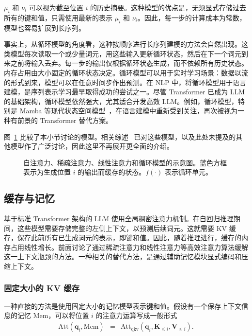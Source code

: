 \noindent $\mu_i$ 和 $\nu_i$ 可以视为截至位置 $i$ 的历史摘要。这种模型的优点是，无须显式存储过去所有的键和值，只需使用最新的表示 $\mu_i$ 和 $\nu_i$。因此，每一步的计算成本为常数，模型也容易扩展到长序列。

事实上，从循环模型的角度看，这种按顺序进行长序列建模的方法会自然出现。这类模型每次读取一个或少量词元，用这些输入更新循环状态，然后在下一个词元到来之前将输入丢弃。每一步的输出仅根据循环状态生成，而不依赖所有历史状态。内存占用由大小固定的循环状态决定。循环模型可以用于实时学习场景：数据以流的形式到来，模型可以在任意时间步作出预测。在 NLP 中，将循环模型用于语言建模，是序列表示学习最早取得成功的尝试之一。尽管 Transformer 已成为 LLM 的基础架构，循环模型依然强大，尤其适合开发高效 LLM。例如，循环模型，特别是 Mamba 等现代状态空间模型~\cite{gu-and-dao:2023mamba}，在语言建模中重新受到关注，再次被视为一种有前景的 Transformer 替代方案。

图~\ref{fig:comparison-of-efficient-llm-architectures} 比较了本小节讨论的模型。相关综述~\cite{Tay-etal:2020efficient,xiao-and-zhu:2023introduction} 已对这些模型，以及此处未提及的其他模型作了广泛讨论，因此这里不再展开更全面的介绍。

\begin{figure}[!t]
\centering

\caption{自注意力、稀疏注意力、线性注意力和循环模型的示意图。蓝色方框表示为生成位置 $i$ 的输出而缓存的状态。$f(\cdot)$ 表示循环单元。}
\label{fig:comparison-of-efficient-llm-architectures}
\end{figure}

\subsection{缓存与记忆}
\label{sec:long-context-cache-and-memory}

\noindent 基于标准 Transformer 架构的 LLM 使用全局稠密注意力机制。在自回归推理期间，这些模型需要存储完整的左侧上下文，以预测后续词元。这就需要 KV 缓存，保存此前所有已生成词元的表示，即键和值。因此，随着推理进行，缓存的内存占用线性增长。前面讨论了通过稀疏注意力和线性注意力等高效注意力算法缓解这一上下文瓶颈的方法。一种相关的替代方法，是通过辅助记忆模块显式编码和压缩上下文。

\subsubsection{固定大小的 KV 缓存}

一种直接的方法是使用固定大小的记忆模型表示键和值。假设有一个保存上下文信息的记忆 $\mathrm{Mem}$，可以将位置 $i$ 的注意力运算写成一般形式
\begin{eqnarray}
\mathrm{Att}(\mathbf{q}_i,\mathrm{Mem}) & = & \mathrm{Att}_{\mathrm{qkv}}(\mathbf{q}_i,\mathbf{K}_{\le i},\mathbf{V}_{\le i}).
\end{eqnarray}

